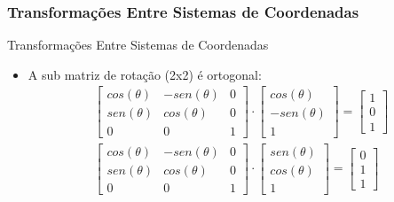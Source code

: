 \documentclass{beamer}
\begin{document}
\begin{frame}
\frametitle{Transformações Entre Sistemas de Coordenadas}

	\begin{block}{Transformações Entre Sistemas de Coordenadas}
		\begin{itemize}
			\item A sub matriz de rotação (2x2) é ortogonal:
				\begin{eqnarray*}
					\begin{bmatrix}
						cos(\theta)	& -sen (\theta) 	& 0 \\
						sen(\theta) 	& cos(\theta)		& 0 \\
						0	& 0	& 1
					\end{bmatrix} \cdot 
					\begin{bmatrix}
						cos(\theta) \\
						-sen (\theta)\\
						1
					\end{bmatrix}
					= \begin{bmatrix}
						1 \\
						0\\
						1
					\end{bmatrix} \\
					\begin{bmatrix}
						cos(\theta)	& -sen (\theta) 	& 0 \\
						sen(\theta) 	& cos(\theta)		& 0 \\
						0	& 0	& 1
					\end{bmatrix} \cdot 
					\begin{bmatrix}
						sen(\theta) \\
						cos (\theta)\\
						1
					\end{bmatrix}
					= \begin{bmatrix}
						0 \\
						1\\
						1
					\end{bmatrix}
				\end{eqnarray*}
		\end{itemize}
	\end{block}

\end{frame}
\end{document}

